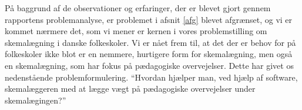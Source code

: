 På baggrund af de observationer og erfaringer, der er blevet gjort gennem rapportens problemanalyse, er problemet i afsnit \ref{afg} blevet afgrænset, og vi er kommet nærmere det, som vi mener er kernen i vores problemstilling om skemalægning i danske folkeskoler. Vi er nået frem til, at det der er behov for på folkeskoler ikke blot er en nemmere, hurtigere form for skemalægning, men også en skemalægning, som har fokus på pædagogiske overvejelser. Dette har givet os nedenstående problemformulering.\newline\newline
``Hvordan hjælper man, ved hjælp af software, skemalæggeren med at lægge vægt på pædagogiske overvejelser under skemalægingen?''
